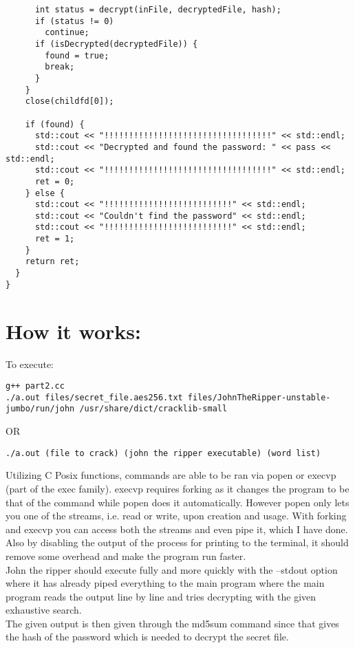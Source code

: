 \documentclass[12pt]{article}
\begin{document}
\begin{lstlisting}
      int status = decrypt(inFile, decryptedFile, hash);
      if (status != 0)
        continue;
      if (isDecrypted(decryptedFile)) {
        found = true;
        break;
      }
    }
    close(childfd[0]);

    if (found) {
      std::cout << "!!!!!!!!!!!!!!!!!!!!!!!!!!!!!!!!!!" << std::endl;
      std::cout << "Decrypted and found the password: " << pass << std::endl;
      std::cout << "!!!!!!!!!!!!!!!!!!!!!!!!!!!!!!!!!!" << std::endl;
      ret = 0;
    } else {
      std::cout << "!!!!!!!!!!!!!!!!!!!!!!!!!!" << std::endl;
      std::cout << "Couldn't find the password" << std::endl;
      std::cout << "!!!!!!!!!!!!!!!!!!!!!!!!!!" << std::endl;
      ret = 1;
    }
    return ret;
  }
}
\end{lstlisting}

\section*{How it works:}

To execute:
\begin{lstlisting}
g++ part2.cc
./a.out files/secret_file.aes256.txt files/JohnTheRipper-unstable-jumbo/run/john /usr/share/dict/cracklib-small
\end{lstlisting}
OR
\begin{verbatim}
./a.out (file to crack) (john the ripper executable) (word list)
\end{verbatim}

Utilizing C Posix functions, commands are able to be ran via popen or execvp (part of the exec family). execvp requires forking as it changes the program to be that of the command while popen does it automatically. However popen only lets you one of the streams, i.e. read or write, upon creation and usage. With forking and execvp you can access both the streams and even pipe it, which I have done. Also by disabling the output of the process for printing to the terminal, it should remove some overhead and make the program run faster. \\

John the ripper should execute fully and more quickly with the --stdout option where it has already piped everything to the main program where the main program reads the output line by line and tries decrypting with the given exhaustive search. \\

The given output is then given through the md5sum command since that gives the hash of the password which is needed to decrypt the secret file. \\ \\
\end{document}
